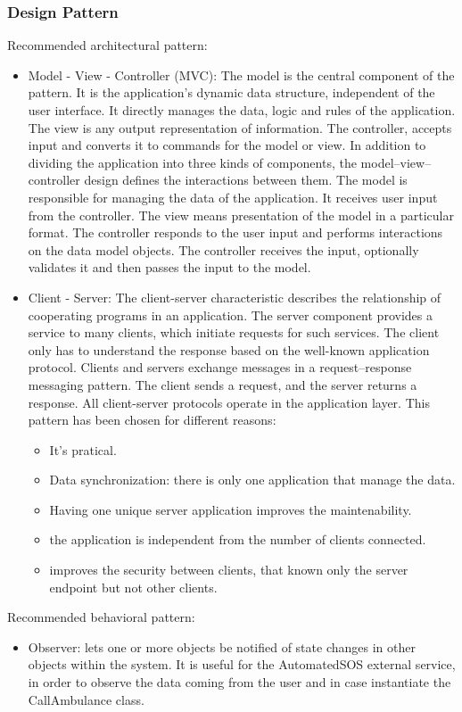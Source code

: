 \documentclass{article}
\begin{document}
\subsubsection{Design Pattern}
Recommended architectural pattern:
\begin{itemize}
\item Model - View - Controller (MVC): The model is the central component of the pattern. It is the application's dynamic data structure, independent of the user interface. It directly manages the data, logic and rules of the application. The view is any output representation of information. The controller, accepts input and converts it to commands for the model or view.
In addition to dividing the application into three kinds of components, the model–view–controller design defines the interactions between them.
The model is responsible for managing the data of the application. It receives user input from the controller. The view means presentation of the model in a particular format. The controller responds to the user input and performs interactions on the data model objects. The controller receives the input, optionally validates it and then passes the input to the model.
\item Client - Server: The client-server characteristic describes the relationship of cooperating programs in an application. The server component provides a service to many clients, which initiate requests for such services. The client only has to understand the response based on the well-known application protocol. Clients and servers exchange messages in a request–response messaging pattern. The client sends a request, and the server returns a response. All client-server protocols operate in the application layer. This pattern has been chosen for different reasons:
\begin{itemize}
\item It’s pratical.
\item Data synchronization: there is only one application that manage the data.
\item Having one unique server application improves the maintenability.
\item the application is independent from the number of clients connected.
\item improves the security between clients, that known only the server endpoint
but not other clients.
\end{itemize}
\end{itemize}
Recommended behavioral pattern:
\begin{itemize}
\item Observer: lets one or more objects be notified of state changes in other objects within the system. It is useful for the AutomatedSOS external service, in order to observe the data coming from the user and in case instantiate the CallAmbulance class.
\end{itemize}
\end{document}
